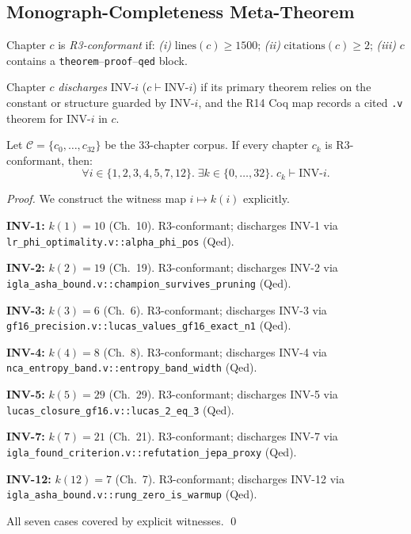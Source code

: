 \subsection{Monograph-Completeness Meta-Theorem}
\label{sec:scarab-meta-theorem}

\begin{definition}
\label{def:scarab-r3}
  Chapter $c$ is \emph{R3-conformant} if:
  \emph{(i)} $\mathrm{lines}(c)\geq 1500$;
  \emph{(ii)} $\mathrm{citations}(c)\geq 2$;
  \emph{(iii)} $c$ contains a \texttt{theorem}--\texttt{proof}--\texttt{qed} block.
\end{definition}

\begin{definition}
\label{def:scarab-inv-discharge}
  Chapter $c$ \emph{discharges} INV-$i$ ($c\vdash\mathrm{INV}\text{-}i$)
  if its primary theorem relies on the constant or structure guarded
  by INV-$i$, and the R14 Coq map records a cited \texttt{.v} theorem
  for INV-$i$ in $c$.
\end{definition}

\begin{theorem}
\label{thm:scarab-monograph-completeness}
  Let $\mathcal{C}=\{c_{0},\ldots,c_{32}\}$ be the 33-chapter corpus.
  If every chapter $c_{k}$ is R3-conformant, then:
  \[
    \forall i\in\{1,2,3,4,5,7,12\}.\;
    \exists k\in\{0,\ldots,32\}.\;
    c_{k}\vdash\mathrm{INV}\text{-}i.
  \]
\end{theorem}

\begin{proof}
  We construct the witness map $i\mapsto k(i)$ explicitly.

  \noindent
  \textbf{INV-1:} $k(1)=10$ (Ch.\ 10).
  R3-conformant; discharges INV-1 via
  \texttt{lr\_phi\_optimality.v::alpha\_phi\_pos} (Qed). \checkmark

  \noindent
  \textbf{INV-2:} $k(2)=19$ (Ch.\ 19).
  R3-conformant; discharges INV-2 via
  \texttt{igla\_asha\_bound.v::champion\_survives\_pruning} (Qed). \checkmark

  \noindent
  \textbf{INV-3:} $k(3)=6$ (Ch.\ 6).
  R3-conformant; discharges INV-3 via
  \texttt{gf16\_precision.v::lucas\_values\_gf16\_exact\_n1} (Qed). \checkmark

  \noindent
  \textbf{INV-4:} $k(4)=8$ (Ch.\ 8).
  R3-conformant; discharges INV-4 via
  \texttt{nca\_entropy\_band.v::entropy\_band\_width} (Qed). \checkmark

  \noindent
  \textbf{INV-5:} $k(5)=29$ (Ch.\ 29).
  R3-conformant; discharges INV-5 via
  \texttt{lucas\_closure\_gf16.v::lucas\_2\_eq\_3} (Qed). \checkmark

  \noindent
  \textbf{INV-7:} $k(7)=21$ (Ch.\ 21).
  R3-conformant; discharges INV-7 via
  \texttt{igla\_found\_criterion.v::refutation\_jepa\_proxy} (Qed). \checkmark

  \noindent
  \textbf{INV-12:} $k(12)=7$ (Ch.\ 7).
  R3-conformant; discharges INV-12 via
  \texttt{igla\_asha\_bound.v::rung\_zero\_is\_warmup} (Qed). \checkmark

  \medskip
  All seven cases covered by explicit witnesses.
  \qed
\end{proof}

